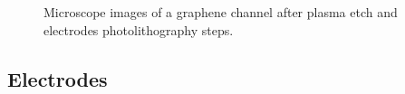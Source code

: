 \documentclass[
  a4paper,
]{scrbook}
\begin{document}
\begin{figure}
\begin{minipage}[t]{0.47\linewidth}
{{}

}

\end{minipage}%

\caption{\label{fig-microscope-graphene-channel}Microscope images of a
graphene channel after plasma etch and electrodes photolithography
steps.}

\end{figure}

\hypertarget{sec-electrodes}{%
\subsection{Electrodes}\label{sec-electrodes}}
\end{document}

